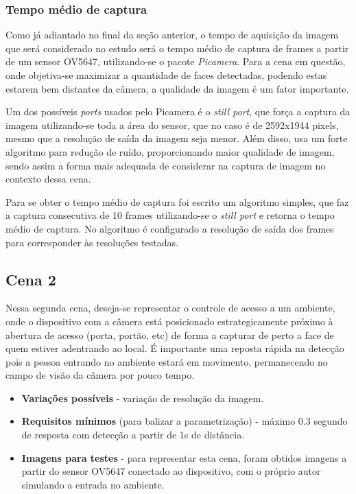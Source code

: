 \subsubsection{Tempo médio de captura}
Como já adiantado no final da seção anterior, o tempo de aquisição da imagem que será considerado no estudo será o tempo médio de captura de frames a partir de um sensor OV5647, utilizando-se o pacote \emph{Picamera}. Para a cena em questão, onde objetiva-se maximizar a quantidade de faces detectadas, podendo estas estarem bem distantes da câmera, a qualidade da imagem é um fator importante.

Um dos possíveis \emph{ports} usados pelo Picamera é o \emph{still port}, que força a captura da imagem utilizando-se toda a área do sensor, que no caso é de 2592x1944 pixels, mesmo que a resolução de saída da imagem seja menor. Além disso, usa um forte algoritmo para redução de ruído, proporcionando maior qualidade de imagem, sendo assim a forma mais adequada de considerar na captura de imagem no contexto dessa cena.

Para se obter o tempo médio de captura foi escrito um algoritmo simples, que faz a captura consecutiva de 10 frames utilizando-se o \emph{still port} e retorna o tempo médio de captura. No algoritmo é configurado a resolução de saída dos frames para corresponder às resoluções testadas.

\subsection{Cena 2}

Nessa segunda cena, deseja-se representar o controle de acesso a um ambiente, onde o dispositivo com a câmera está posicionado estrategicamente próximo à abertura de acesso (porta, portão, etc) de forma a capturar de perto a face de quem estiver adentrando ao local. É importante uma reposta rápida na detecção pois a pessoa entrando no ambiente estará em movimento, permanecendo no campo de visão da câmera por pouco tempo.

\begin{itemize}
    \item \textbf{Variações possíveis} - variação de resolução da imagem.
    \item \textbf{Requisitos mínimos} (para balizar a parametrização) - máximo 0.3 segundo de resposta com detecção a partir de 1s de distância.
    \item \textbf{Imagens para testes} - para representar esta cena, foram obtidos imagens a partir do sensor OV5647 conectado ao dispositivo, com o próprio autor simulando a entrada no ambiente.
\end{itemize}


